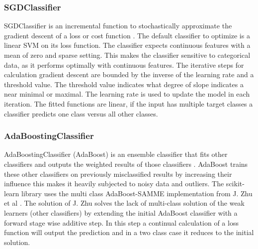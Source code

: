 \documentclass[a4paper,10pt]{article}
\begin{document}
\subsubsection{SGDClassifier}
SGDClassifier is an incremental function to stochastically approximate the gradient descent of a loss or cost function \cite{SGDClass}. The default classifier to optimize is a linear SVM on its loss function. The classifier expects continuous features with a mean of zero and sparse setting. This makes the classifier sensitive to categorical data, as it performs optimally with continuous features. The iterative steps for calculation gradient descent are bounded by the inverse of the learning rate and a threshold value. The threshold value indicates what degree of slope indicates a near minimal or maximal. The learning rate is used to update the model in each iteration. The fitted functions are linear, if the input has multiple target classes a classifier predicts one class versus all other classes. 

\subsubsection{AdaBoostingClassifier}
AdaBoostingClassifier (AdaBoost) is an ensemble classifier that fits other classifiers and outputs the weighted results of those classifiers \cite{AdaBoost}. AdaBoost trains these other classifiers on previously misclassified results by increasing their influence this makes it heavily subjected to noisy data and outliers. The scikit-learn library uses the multi class AdaBoost-SAMME implementation from J. Zhu et al \cite{MadaB}. The solution of J. Zhu solves the lack of multi-class solution of the weak learners (other classifiers) by extending the initial AdaBoost classifier with a forward stage wise additive step. In this step a continual calculation of a loss function will output the prediction and in a two class case it reduces to the initial solution.
\end{document}
